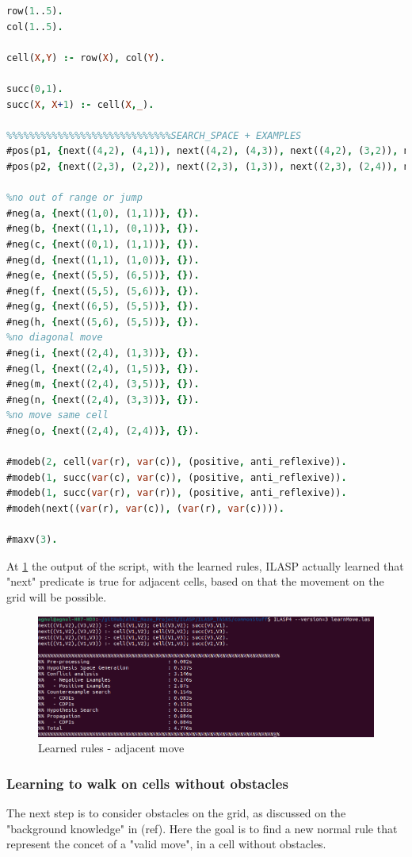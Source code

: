 \newpage
\begin{lstlisting}[language=Prolog]
%%%%%%%%%%%%%%%%%%%%%%%%learn how to move on near cells
row(1..5).
col(1..5).

cell(X,Y) :- row(X), col(Y).

succ(0,1).
succ(X, X+1) :- cell(X,_).

%%%%%%%%%%%%%%%%%%%%%%%%%%%%%SEARCH_SPACE + EXAMPLES
#pos(p1, {next((4,2), (4,1)), next((4,2), (4,3)), next((4,2), (3,2)), next((4,2), (5,2))}, {}).
#pos(p2, {next((2,3), (2,2)), next((2,3), (1,3)), next((2,3), (2,4)), next((2,3), (3,3))}, {}).

%no out of range or jump
#neg(a, {next((1,0), (1,1))}, {}).
#neg(b, {next((1,1), (0,1))}, {}).
#neg(c, {next((0,1), (1,1))}, {}).
#neg(d, {next((1,1), (1,0))}, {}).
#neg(e, {next((5,5), (6,5))}, {}).
#neg(f, {next((5,5), (5,6))}, {}).
#neg(g, {next((6,5), (5,5))}, {}).
#neg(h, {next((5,6), (5,5))}, {}).
%no diagonal move
#neg(i, {next((2,4), (1,3))}, {}).
#neg(l, {next((2,4), (1,5))}, {}).
#neg(m, {next((2,4), (3,5))}, {}).
#neg(n, {next((2,4), (3,3))}, {}).
%no move same cell
#neg(o, {next((2,4), (2,4))}, {}).

#modeb(2, cell(var(r), var(c)), (positive, anti_reflexive)).
#modeb(1, succ(var(c), var(c)), (positive, anti_reflexive)).
#modeb(1, succ(var(r), var(r)), (positive, anti_reflexive)).
#modeh(next((var(r), var(c)), (var(r), var(c)))).

#maxv(3).
\end{lstlisting}
At \ref{fig:asd} the output of the script, with the learned rules, ILASP actually learned that "next" predicate is true for adjacent cells, based on that the movement on the grid will be possible.

\begin{figure}
	\centering
	\includegraphics[scale=0.5]{img/learnMoveAdj.png}
	\caption{Learned rules - adjacent move}\label{fig:asd}
\end{figure}

\newpage
\subsubsection{Learning to walk on cells without obstacles}
The next step is to consider obstacles on the grid, as discussed on the "background knowledge" in (ref). Here the goal is to find a new normal rule that represent the concet of a "valid move", in a cell without obstacles.

